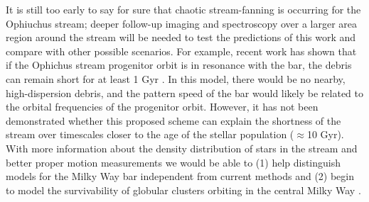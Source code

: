 \documentclass[letterpaper,12pt,preprint]{aastex}
\newcommand{\todo}[1]{{\color{red} TODO: #1}}
\begin{document}
It is still too early to say for sure that chaotic stream-fanning is occurring for the Ophiuchus stream; deeper follow-up imaging and spectroscopy over a larger area region around the stream will be needed to test the predictions of this work and compare with other possible scenarios. For example, recent work has shown that if the Ophichus stream progenitor orbit is in resonance with the bar, the debris can remain short for at least 1 Gyr \citep{hattori15}. In this model, there would be no nearby, high-dispersion debris, and the pattern speed of the bar would likely be related to the orbital frequencies of the progenitor orbit. However, it has not been demonstrated whether this proposed scheme can explain the shortness of the stream over timescales closer to the age of the stellar population ($\approx$10 Gyr). With more information about the density distribution of stars in the stream and better proper motion measurements we would be able to (1) help distinguish models for the Milky Way bar independent from current methods and (2) begin to model the survivability of globular clusters orbiting in the central Milky Way \citep[e.g.,][]{gnedin97}. 

%
%
%
%
%
%
\end{document}
